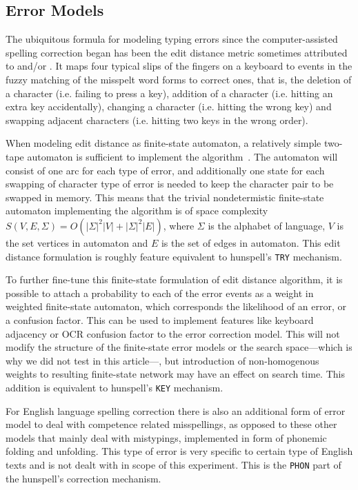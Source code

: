 \documentclass[11pt]{article}
\begin{document}
\subsection{Error Models}
\label{subsec:error-models}

The ubiquitous formula for modeling typing errors since the computer-assisted
spelling correction began has been the edit distance metric sometimes
attributed to  and/or . It maps
four typical slips of the fingers on a keyboard to events in the fuzzy matching
of the misspelt word forms to correct ones, that is, the deletion of a
character (i.e. failing to press a key), addition of a character (i.e. hitting
an extra key accidentally), changing a character (i.e. hitting the wrong key)
and swapping adjacent characters (i.e. hitting two keys in the wrong order).

When modeling edit distance as finite-state automaton, a relatively simple
two-tape automaton is sufficient to implement the algorithm~\cite{hassan/2008}.
The automaton will consist of one arc for each type of error, and additionally
one state for each swapping of character type of error is needed to keep the
character pair to be swapped in memory. This means that the trivial
nondetermistic finite-state automaton implementing the algorithm is of space
complexity $S(V, E, \Sigma) = O(|\Sigma|^2 |V| + |\Sigma|^2 |E|)$, where
$\Sigma$ is the alphabet of language, $V$ is the set vertices in automaton and
$E$ is the set of edges in automaton.  This edit distance formulation is
roughly feature equivalent to hunspell's \texttt{TRY} mechanism.

To further fine-tune this finite-state formulation of edit distance algorithm,
it is possible to attach a probability to each of the error events as a weight
in weighted finite-state automaton, which corresponds the likelihood of an
error, or a confusion factor. This can be used to implement features like
keyboard adjacency or OCR confusion factor to the error correction model. This
will not modify the structure of the finite-state error models or the search
space---which is why we did not test in this article---, but introduction of
non-homogenous weights to resulting finite-state network may have an effect on
search time. This addition is equivalent to hunspell's \texttt{KEY} mechanism.

For English language spelling correction there is also an additional form of
error model to deal with competence related misspellings, as opposed to these
other models that mainly deal with mistypings, implemented in form of phonemic
folding and unfolding. This type of error is very specific to certain type of
English texts and is not dealt with in scope of this experiment. This is
the \texttt{PHON} part of the hunspell's correction mechanism.
\end{document}
